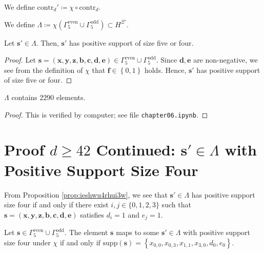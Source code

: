 \begin{definition}
    We define \( \mathrm{contr}_d' \coloneqq \chi \circ \mathrm{contr}_d \).
\end{definition}


\begin{definition}
    We define \( \Lambda  \coloneqq \chi( \Gamma^{\mathrm{even}}_5 \cup \Gamma^{\mathrm{odd}}_5 ) \subset H^{\Xi'} \).
\end{definition}


\begin{proposition}\label{prop:ieshwu4rhui3w}
    Let \( \mathbf{s}' \in \Lambda \). Then, \( \mathbf{s}' \) has positive support of size five or four.
\end{proposition}

\begin{proof}
    Let \( \mathbf{s} = (\mathbf{x}, \mathbf{y}, \mathbf{z}, \mathbf{b}, \mathbf{c}, \mathbf{d}, \mathbf{e}) \in  \Gamma^{\mathrm{even}}_5 \cup \Gamma^{\mathrm{odd}}_5 \). Since \( \mathbf{d}, \mathbf{e} \) are non-negative, we see from the definition of \( \chi \)
    that \( \mathbf{f} \in \left\{ 0,1 \right\} \) holds. Hence, \( \mathbf{s}' \) has positive support of size five or four.
\end{proof}
\begin{proposition}
    \( \Lambda \) contains \( 2290 \) elements.
\end{proposition}

\begin{proof}
    This is verified by computer; see \cite{ducrepo} file \texttt{chapter06.ipynb}.
\end{proof}

\section{Proof \( d \geq 42\) Continued: \( \mathbf{s}' \in \Lambda\) with Positive Support Size Four}

\begin{corollary}
    From Proposition \ref{prop:ieshwu4rhui3w}, we see that \( \mathbf{s}' \in \Lambda \) has positive support size four if and only if there exist \( i,j \in \{ 0, 1,2,3 \} \) such that \( \mathbf{s} = (\mathbf{x}, \mathbf{y}, \mathbf{z}, \mathbf{b}, \mathbf{c}, \mathbf{d}, \mathbf{e}) \) satisfies \( d_i = 1 \) and \( e_j = 1 \).
\end{corollary}

\begin{corollary}
    Let \( \mathbf{s} \in \Gamma^{\mathrm{even}}_5 \cup \Gamma^{\mathrm{odd}}_5 \). The element \( \mathbf{s} \) maps to some \( \mathbf{s}' \in \Lambda \) with positive support size four under \( \chi \) if and only if \( \mathrm{supp}(\mathbf{s}) = \left\{ x_{0,0}, x_{0,3}, x_{1,1}, x_{3,0}, d_0, e_0 \right\} \).
\end{corollary}

